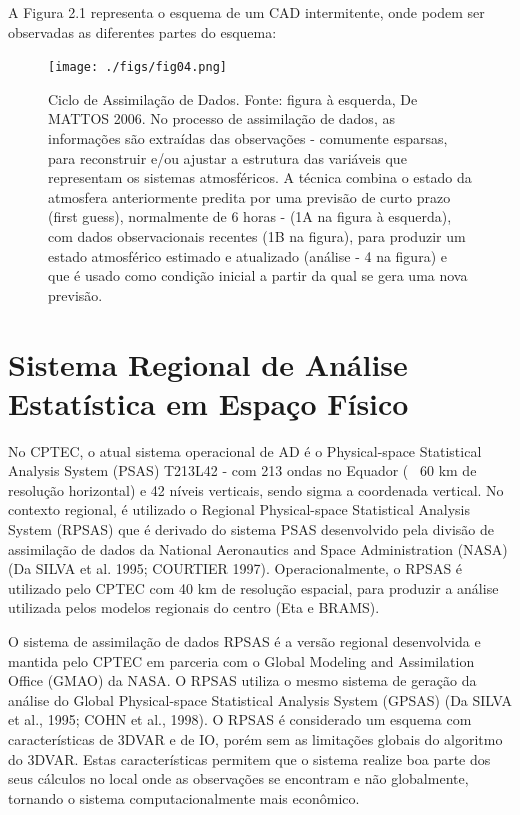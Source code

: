 A Figura 2.1 representa o esquema de um CAD intermitente, onde podem ser observadas as diferentes partes do esquema:

\begin{figure}
\centering
\texttt{[image: ./figs/fig04.png]}
\caption{Ciclo de Assimilação de Dados. Fonte: figura à esquerda, De MATTOS 2006. No processo de assimilação de dados, as informações são extraídas das observações - comumente esparsas, para reconstruir e/ou ajustar a estrutura das variáveis que representam os sistemas atmosféricos. A técnica combina o estado da atmosfera anteriormente predita por uma previsão de curto prazo (first guess), normalmente de 6 horas - (1A na figura à esquerda), com dados observacionais recentes (1B na figura), para produzir um estado atmosférico estimado e atualizado (análise - 4 na figura) e que é usado como condição inicial a partir da qual se gera uma nova previsão.}
\label{fig04}
\end{figure}

\section{Sistema Regional de Análise Estatística em Espaço Físico}
\label{ss:rpsas}

No CPTEC, o atual sistema operacional de AD é o Physical-space Statistical Analysis System (PSAS) T213L42 - com 213 ondas no Equador (~ 60 km de resolução horizontal) e 42 níveis verticais, sendo sigma a coordenada vertical. No contexto regional, é utilizado o Regional Physical-space Statistical Analysis System (RPSAS) que é derivado do sistema PSAS desenvolvido pela divisão de assimilação de dados da National Aeronautics and Space Administration (NASA) (Da SILVA et al. 1995; COURTIER 1997). Operacionalmente, o RPSAS é utilizado pelo CPTEC com 40 km de resolução espacial, para produzir a análise utilizada pelos modelos regionais do centro (Eta e BRAMS).

O sistema de assimilação de dados RPSAS é a versão regional desenvolvida e mantida pelo CPTEC em parceria com o Global Modeling and Assimilation Office (GMAO) da NASA. O RPSAS utiliza o mesmo sistema de geração da análise do Global Physical-space Statistical Analysis System (GPSAS) (Da SILVA et al., 1995; COHN et al., 1998). O RPSAS é considerado um esquema com características de 3DVAR e de IO, porém sem as limitações globais do algoritmo do 3DVAR. Estas características permitem que o sistema realize boa parte dos seus cálculos no local onde as observações se encontram e não globalmente, tornando o sistema computacionalmente mais econômico. 

